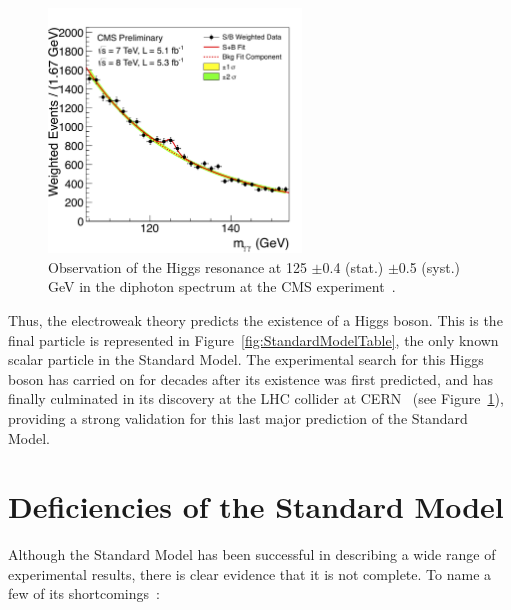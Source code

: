 \begin{figure}
   \begin{center}
      \includegraphics[width=0.6\textwidth]{figures/higgs-resonance}
      \caption{Observation of the Higgs resonance at 125 $\pm$0.4 (stat.) $\pm$0.5 (syst.) GeV in the diphoton spectrum at the CMS experiment~\cite{Chatrchyan:2012ufa}.}
      \label{fig:higgs-resonance}
   \end{center}
\end{figure}

Thus, the electroweak theory predicts the existence of a Higgs boson. This is the final particle is represented in Figure~\ref{fig:StandardModelTable}, the only known scalar particle in the Standard Model. The experimental search for this Higgs boson has carried on for decades after its existence was first predicted, and has finally culminated in its discovery at the LHC collider at CERN~\cite{Aad:2012tfa,Chatrchyan:2012ufa} (see Figure~\ref{fig:higgs-resonance}), providing a strong validation for this last major prediction of the Standard Model.

\section{Deficiencies of the Standard Model\label{sec:SMdeficiencies}}

Although the Standard Model has been successful in describing a wide range of experimental results, there is clear evidence that it is not complete. To name a few of its shortcomings~\cite{BettiniPhysics}:

